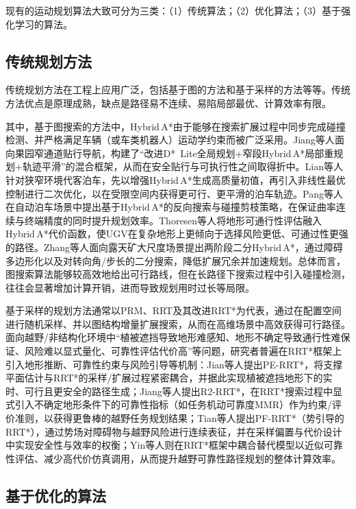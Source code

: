 \documentclass{iopjournal}
\begin{document}
现有的运动规划算法大致可分为三类：（1）传统算法；（2）优化算法；（3）基于强化学习的算法。

\subsection{传统规划方法}

传统规划方法在工程上应用广泛，包括基于图的方法和基于采样的方法等等。传统方法优点是原理成熟，缺点是路径易不连续、易陷局部最优、计算效率有限。

其中，基于图搜索的方法中，Hybrid\,A*由于能够在搜索扩展过程中同步完成碰撞检测、并严格满足车辆（或车类机器人）运动学约束而被广泛采用。Jiang等人\cite{jiang2025hybrid}面向果园窄通道贴行导航，构建了``改进D*~Lite全局规划+窄段Hybrid\,A*局部重规划+轨迹平滑''的混合框架，从而在安全贴行与可执行性之间取得折中。Lian等人\cite{lian2023trajectory}针对狭窄环境代客泊车，先以增强Hybrid\,A*生成高质量初值，再引入非线性最优控制进行二次优化，以在受限空间内获得更可行、更平滑的泊车轨迹。Pang等人\cite{pang2022curvature}在自动泊车场景中提出基于Hybrid\,A*的反向搜索与碰撞剪枝策略，在保证曲率连续与终端精度的同时提升规划效率。Thoresen等人\cite{thoresen2021path}将地形可通行性评估融入Hybrid\,A*代价函数，使UGV在复杂地形上更倾向于选择风险更低、可通过性更强的路径。Zhang等人\cite{zhang2024twostage}面向露天矿大尺度场景提出两阶段二分Hybrid\,A*，通过障碍多边形化以及对转向角/步长的二分搜索，降低扩展冗余并加速规划。总体而言，图搜索算法能够较高效地给出可行路线，但在长路径下搜索过程中引入碰撞检测，往往会显著增加计算开销，进而导致规划用时过长等局限。

基于采样的规划方法通常以PRM、RRT及其改进RRT*为代表，通过在配置空间进行随机采样、并以图结构增量扩展搜索，从而在高维场景中高效获得可行路径。面向越野/非结构化环境中``植被遮挡导致地形难感知、地形不确定导致通行性难保证、风险难以显式量化、可靠性评估代价高''等问题，研究者普遍在RRT*框架上引入地形推断、可靠性约束与风险引导等机制：Jian等人\cite{jian2024path}提出PE-RRT*，将支撑平面估计与RRT*的采样/扩展过程紧密耦合，并据此实现植被遮挡地形下的实时、可行且更安全的路径生成；Jiang等人\cite{jiang2022r2rrt}提出R2-RRT*，在RRT*搜索过程中显式引入不确定地形条件下的可靠性指标（如任务机动可靠度MMR）作为约束/评价准则，以获得更鲁棒的越野任务规划结果；Tian等人\cite{tian2023driving}提出PF-RRT*（势引导的RRT*），通过势场对障碍物与越野风险进行连续表征，并在采样偏置与代价设计中实现安全性与效率的权衡；Yin等人\cite{yin2023efficient}则在RRT*框架中耦合替代模型以近似可靠性评估、减少高代价仿真调用，从而提升越野可靠性路径规划的整体计算效率。

\subsection{基于优化的算法}
\end{document}
